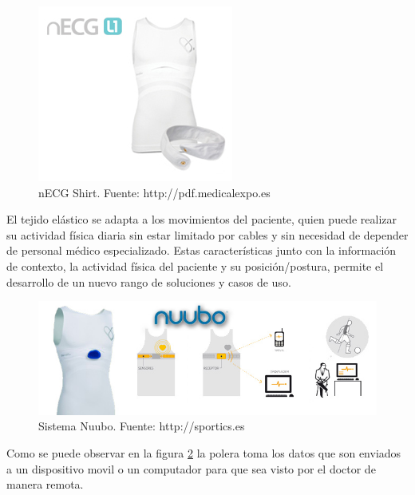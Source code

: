 \begin{figure}[H]
	\centering
	\includegraphics[scale=0.6]{figuras/estadoarte/nuubo/shirt.png}
	\caption{nECG Shirt. Fuente: http://pdf.medicalexpo.es}
	\label{shirt}
\end{figure}

El tejido elástico se adapta a los movimientos del paciente, quien puede realizar su actividad física diaria sin estar limitado por cables y sin necesidad de depender de personal médico especializado. Estas características junto con la información de contexto, la actividad física del paciente y su posición/postura, permite el desarrollo de un nuevo rango de soluciones y casos de uso. 

\begin{figure}[H]
	\centering
	\includegraphics[scale=0.7]{figuras/estadoarte/nuubo/nuubo.png}
	\caption{Sistema Nuubo. Fuente: http://sportics.es}
	\label{nuubo}
\end{figure}

Como se puede observar en la figura \ref{nuubo} la polera toma los datos que son enviados a un dispositivo movil o un computador para que sea visto por el doctor de manera remota.